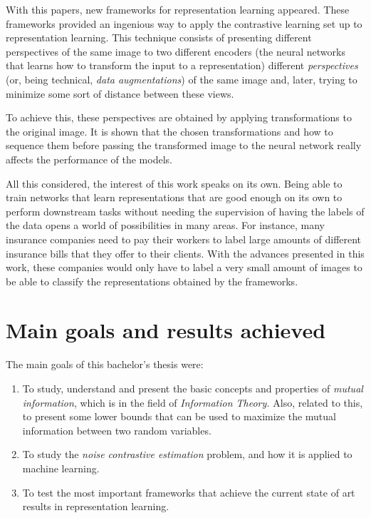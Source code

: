 With this papers, new frameworks for representation learning appeared. These frameworks provided an ingenious way to apply  the contrastive learning set up to representation learning. This technique consists of presenting different perspectives of the same image to two different encoders (the neural networks that learns how to transform the input to a representation) different \emph{perspectives} (or, being technical, \emph{data augmentations}) of the same image and, later, trying to minimize some sort of distance between these views.  

To achieve this, these perspectives are obtained by applying transformations to the original image. It is shown that the chosen transformations and how to sequence them before passing the transformed image to the neural network really affects the performance of the models.

All this considered, the interest of this work  speaks on its own. Being able to train networks that learn representations that are good enough on its own to perform downstream tasks without needing the supervision of having the labels of the data opens a world of possibilities in many areas. For instance, many insurance companies need to pay their workers to label large amounts of  different insurance bills that they offer to their clients. With the advances presented in this work, these companies would only have to label a very small amount of images to be able to classify the representations obtained by the frameworks.


\section*{Main goals and results achieved}

The main goals of this bachelor's thesis were:
\begin{enumerate}
\item To study, understand and present the basic concepts and properties of \emph{mutual information}, which is in the field of \emph{Information Theory.} Also, related to this, to present some lower bounds that can be used to maximize the mutual information between two random variables.
\item To study the \emph{noise contrastive estimation} problem, and how it is applied to machine learning.

\item To test the most important frameworks that achieve the current state of art results in representation learning. 
\end{enumerate}

